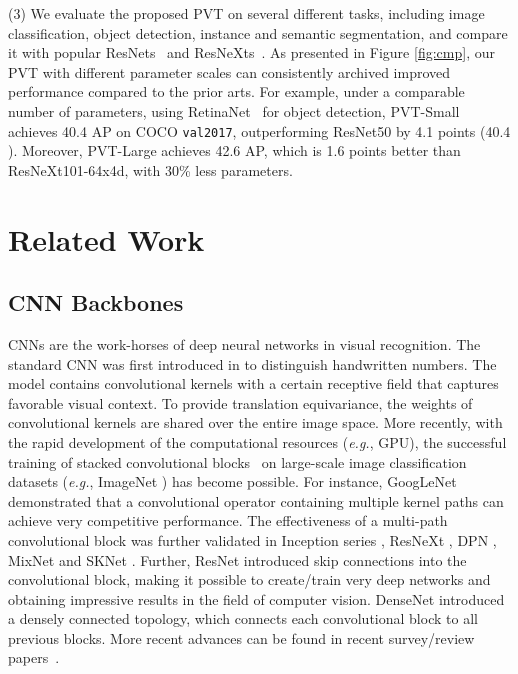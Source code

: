 \documentclass[10pt,twocolumn,letterpaper]{article}
\def\eg{\emph{e.g.}}
\begin{document}
    (3) We evaluate the proposed PVT on several different tasks, including image classification, object detection, instance and semantic segmentation, and compare it with 
    popular
    ResNets~\cite{he2016deep} and ResNeXts~\cite{xie2017aggregated}. As presented in Figure \ref{fig:cmp}, 
    our PVT with different parameter scales
    can consistently archived improved performance compared to the prior arts.
    For example, under a comparable number of parameters, using RetinaNet~\cite{lin2017focal} for object detection, PVT-Small achieves 40.4 AP on COCO \texttt{val2017}, outperforming ResNet50 by 4.1 points (40.4 ).
    Moreover, PVT-Large achieves 42.6 AP, which is 1.6 points better than ResNeXt101-64x4d, with  30\% less parameters.


\section{Related Work}

\subsection{CNN Backbones}


%
CNNs are the work-horses of deep neural networks in visual recognition. The standard
%
CNN was first introduced in \cite{lecun1998gradient} to distinguish handwritten numbers. 
%
The model
contains convolutional kernels with a certain receptive field that captures favorable visual context. To provide translation equivariance, the weights of convolutional kernels are shared over the entire image space. More recently, with the rapid development of the computational resources (\eg, GPU), the successful training of stacked convolutional blocks~\cite{krizhevsky2012imagenet,simonyan2014very}
%
on large-scale image classification datasets (\eg, ImageNet \cite{russakovsky2015imagenet}) has become possible. For instance, GoogLeNet \cite{szegedy2015going} demonstrated that a convolutional operator containing multiple kernel paths can achieve very competitive performance. 
%
The effectiveness of a multi-path convolutional block was further validated in Inception series \cite{szegedy2016rethinking,szegedy2017inception}, ResNeXt \cite{xie2017aggregated}, DPN \cite{chen2017dual}, MixNet \cite{wang2018mixed} and SKNet \cite{li2019selective}.
%
Further, ResNet \cite{he2016deep} introduced skip connections into the convolutional block, making it possible to create/train very deep networks and obtaining impressive results in the field of computer vision.
%
DenseNet \cite{huang2017densely} introduced a densely connected topology, which connects each convolutional block to all previous blocks. 
More recent advances can be found in recent survey/review papers~\cite{khan2020survey,shorten2019survey}.
%
\end{document}
